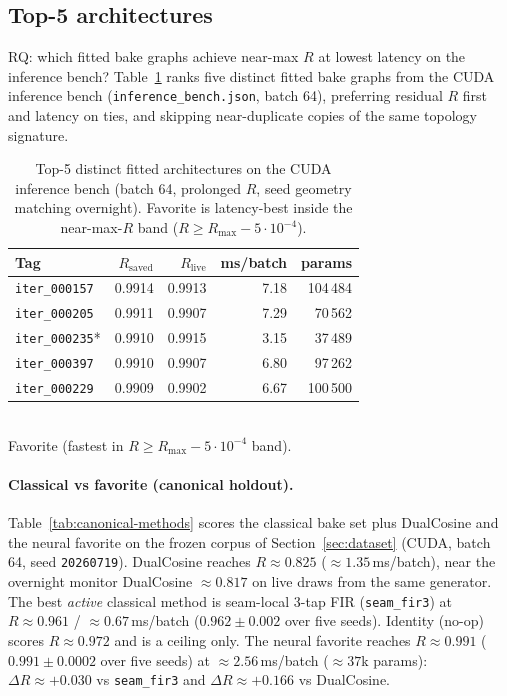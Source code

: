 \subsection{Top-5 architectures}
\label{sec:top5-arch}
RQ: which fitted bake graphs achieve near-max $R$ at lowest latency on the inference bench?
Table~\ref{tab:top5} ranks five distinct fitted bake graphs from the CUDA inference bench
(\texttt{inference\_bench.json}, batch 64), preferring residual $R$ first and latency on ties,
and skipping near-duplicate copies of the same topology signature.

\begin{table}[t]
  \centering
  \caption{Top-5 distinct fitted architectures on the CUDA inference bench (batch 64, prolonged $R$, seed geometry matching overnight). Favorite is latency-best inside the near-max-$R$ band ($R\ge R_{\max}-5\cdot10^{-4}$).}
  \label{tab:top5}
  \setlength{\tabcolsep}{3pt}
  \begin{tabular}{@{}lrrrr@{}}
    \toprule
    Tag & $R_{\mathrm{saved}}$ & $R_{\mathrm{live}}$ & ms/batch & params \\
    \midrule
    \texttt{iter\_000157} & 0.9914 & 0.9913 & 7.18 & 104\,484 \\
    \texttt{iter\_000205} & 0.9911 & 0.9907 & 7.29 & 70\,562 \\
    \texttt{iter\_000235}* & 0.9910 & 0.9915 & 3.15 & 37\,489 \\
    \texttt{iter\_000397} & 0.9910 & 0.9907 & 6.80 & 97\,262 \\
    \texttt{iter\_000229} & 0.9909 & 0.9902 & 6.67 & 100\,500 \\
    \bottomrule
  \end{tabular}\\[0.4em]
  {\footnotesize *Favorite (fastest in $R\ge R_{\max}-5\cdot10^{-4}$ band).}
\end{table}

\paragraph{Classical vs favorite (canonical holdout).}
Table~\ref{tab:canonical-methods} scores the classical bake set plus DualCosine and the neural favorite on the frozen corpus of Section~\ref{sec:dataset} (CUDA, batch 64, seed \texttt{20260719}).
DualCosine reaches $R\approx 0.825$ ($\approx 1.35$\,ms/batch), near the overnight monitor DualCosine $\approx 0.817$ on live draws from the same generator.
The best \emph{active} classical method is seam-local 3-tap FIR (\texttt{seam\_fir3}) at $R\approx 0.961$ / $\approx 0.67$\,ms/batch ($0.962\pm0.002$ over five seeds).
Identity (no-op) scores $R\approx 0.972$ and is a ceiling only.
The neural favorite reaches $R\approx 0.991$ ($0.991\pm0.0002$ over five seeds) at $\approx 2.56$\,ms/batch ($\approx 37$k params): $\Delta R \approx {+}0.030$ vs \texttt{seam\_fir3} and $\Delta R \approx {+}0.166$ vs DualCosine.

